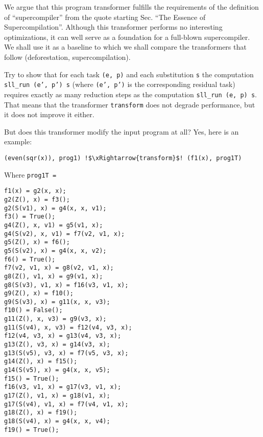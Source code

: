 We argue that this program transformer fulfills the requirements of the
definition of ``supercompiler'' from the quote starting Sec. ``The Essence of Supercompilation''.
Although this transformer performs no interesting optimizations, it
can well serve as a foundation for a full-blown supercompiler.
We shall use it as a baseline to which we shall compare the
transformers that follow (deforestation, supercompilation).

\begin{exercise}
Try to show that for each task \texttt{(e, p)} and each substitution
\texttt{s} the computation \texttt{sll\_run (e', p') s} (where \texttt{(e', p')}
is the corresponding residual task) requires exactly as many reduction steps
as the computation \texttt{sll\_run (e, p) s}. 
That means that the transformer \texttt{transform} does not degrade performance,
but it does not improve it either.
\end{exercise}

But does this transformer modify the input program at all? Yes, here is an example:
\begin{lstlisting}[language=sll,escapechar=!]
(even(sqr(x)), prog1) !$\xRightarrow{transform}$! (f1(x), prog1T)
\end{lstlisting}
Where \texttt{prog1T =}
\begin{lstlisting}[language=sll]
f1(x) = g2(x, x);
g2(Z(), x) = f3();
g2(S(v1), x) = g4(x, x, v1);
f3() = True();
g4(Z(), x, v1) = g5(v1, x);
g4(S(v2), x, v1) = f7(v2, v1, x);
g5(Z(), x) = f6();
g5(S(v2), x) = g4(x, x, v2);
f6() = True();
f7(v2, v1, x) = g8(v2, v1, x);
g8(Z(), v1, x) = g9(v1, x);
g8(S(v3), v1, x) = f16(v3, v1, x);
g9(Z(), x) = f10();
g9(S(v3), x) = g11(x, x, v3);
f10() = False();
g11(Z(), x, v3) = g9(v3, x);
g11(S(v4), x, v3) = f12(v4, v3, x);
f12(v4, v3, x) = g13(v4, v3, x);
g13(Z(), v3, x) = g14(v3, x);
g13(S(v5), v3, x) = f7(v5, v3, x);
g14(Z(), x) = f15();
g14(S(v5), x) = g4(x, x, v5);
f15() = True();
f16(v3, v1, x) = g17(v3, v1, x);
g17(Z(), v1, x) = g18(v1, x);
g17(S(v4), v1, x) = f7(v4, v1, x);
g18(Z(), x) = f19();
g18(S(v4), x) = g4(x, x, v4);
f19() = True();
\end{lstlisting}

